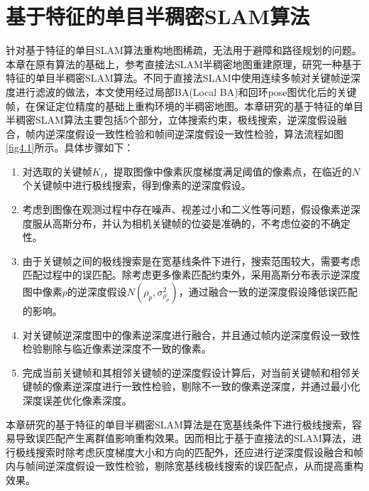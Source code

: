 
\chapter{基于特征的单目半稠密SLAM算法}
\label{chap:Semi-Dense}

针对基于特征的单目SLAM算法重构地图稀疏，无法用于避障和路径规划的问题。本章在原有算法的基础上，参考直接法SLAM半稠密地图重建原理，研究一种基于特征的单目半稠密SLAM算法。不同于直接法SLAM中使用连续多帧对关键帧逆深度进行滤波的做法，本文使用经过局部BA(Local BA)和回环pose图优化后的关键帧，在保证定位精度的基础上重构环境的半稠密地图。本章研究的基于特征的单目半稠密SLAM算法主要包括5个部分，立体搜索约束，极线搜索，逆深度假设融合，帧内逆深度假设一致性检验和帧间逆深度假设一致性检验，算法流程如图\ref{fig4.1}所示。具体步骤如下：
\begin{enumerate}[label={(\arabic*)}]

\item 对选取的关键帧$K_i$，提取图像中像素灰度梯度满足阈值的像素点，在临近的$N$个关键帧中进行极线搜索，得到像素的逆深度假设。

\item 考虑到图像在观测过程中存在噪声、视差过小和二义性等问题，假设像素逆深度服从高斯分布\upcite{[4.1]}，并认为相机关键帧的位姿是准确的，不考虑位姿的不确定性。

\item 由于关键帧之间的极线搜索是在宽基线条件下进行，搜索范围较大，需要考虑匹配过程中的误匹配。除考虑更多像素匹配约束外，采用高斯分布表示逆深度图中像素$p$的逆深度假设$N(\rho_p, \sigma_{\rho_p}^2)$，通过融合一致的逆深度假设降低误匹配的影响。

\item 对关键帧逆深度图中的像素逆深度进行融合，并且通过帧内逆深度假设一致性检验剔除与临近像素逆深度不一致的像素。

\item 完成当前关键帧和其相邻关键帧的逆深度假设计算后，对当前关键帧和相邻关键帧的像素逆深度进行一致性检验，剔除不一致的像素逆深度，并通过最小化深度误差优化像素深度。

\end{enumerate}

本章研究的基于特征的单目半稠密SLAM算法是在宽基线条件下进行极线搜索，容易导致误匹配产生离群值影响重构效果。因而相比于基于直接法的SLAM算法，进行极线搜索时除考虑灰度梯度大小和方向的匹配外，还应进行逆深度假设融合和帧内与帧间逆深度假设一致性检验，剔除宽基线极线搜索的误匹配点，从而提高重构效果。

